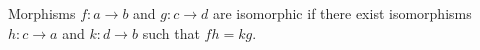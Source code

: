 \begin{definition}
Morphisms $f:a\rightarrow b$ and $g:c\rightarrow d$ are isomorphic
if there exist isomorphisms $h:c\rightarrow a$ and $k:d\rightarrow b$
such that $fh = kg$.
\end{definition}